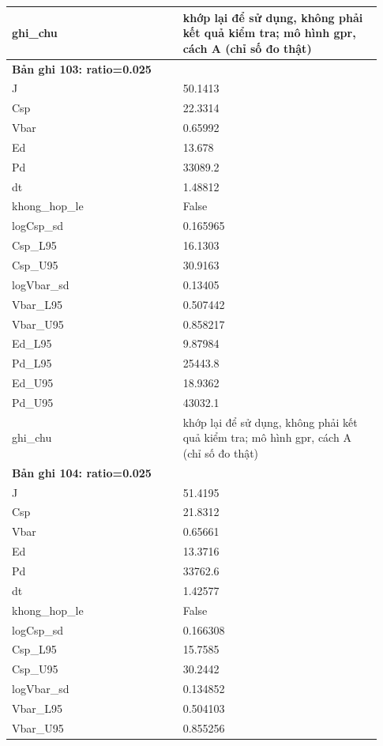 \begin{longtable}{p{0.43\linewidth}p{0.50\linewidth}}
ghi\_\allowbreak chu & khớp lại để sử dụng, không phải kết quả kiểm tra; mô hình gpr, cách A (chỉ số đo thật) \\
\midrule
\multicolumn{2}{p{0.95\linewidth}}{\textbf{Bản ghi 103: ratio=0.025}} \\
J & 50.1413 \\
Csp & 22.3314 \\
Vbar & 0.65992 \\
Ed & 13.678 \\
Pd & 33089.2 \\
dt & 1.48812 \\
khong\_\allowbreak hop\_\allowbreak le & False \\
logCsp\_\allowbreak sd & 0.165965 \\
Csp\_\allowbreak L95 & 16.1303 \\
Csp\_\allowbreak U95 & 30.9163 \\
logVbar\_\allowbreak sd & 0.13405 \\
Vbar\_\allowbreak L95 & 0.507442 \\
Vbar\_\allowbreak U95 & 0.858217 \\
Ed\_\allowbreak L95 & 9.87984 \\
Pd\_\allowbreak L95 & 25443.8 \\
Ed\_\allowbreak U95 & 18.9362 \\
Pd\_\allowbreak U95 & 43032.1 \\
ghi\_\allowbreak chu & khớp lại để sử dụng, không phải kết quả kiểm tra; mô hình gpr, cách A (chỉ số đo thật) \\
\midrule
\multicolumn{2}{p{0.95\linewidth}}{\textbf{Bản ghi 104: ratio=0.025}} \\
J & 51.4195 \\
Csp & 21.8312 \\
Vbar & 0.65661 \\
Ed & 13.3716 \\
Pd & 33762.6 \\
dt & 1.42577 \\
khong\_\allowbreak hop\_\allowbreak le & False \\
logCsp\_\allowbreak sd & 0.166308 \\
Csp\_\allowbreak L95 & 15.7585 \\
Csp\_\allowbreak U95 & 30.2442 \\
logVbar\_\allowbreak sd & 0.134852 \\
Vbar\_\allowbreak L95 & 0.504103 \\
Vbar\_\allowbreak U95 & 0.855256 \\

\end{longtable}
